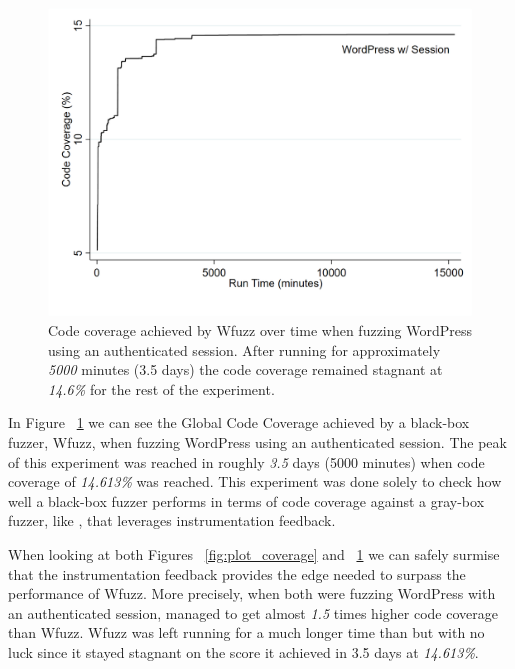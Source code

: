 \begin{figure}[!htb]
  \centering \includegraphics[width=\linewidth]{figures/plot_coverage2.pdf}
  \caption{Code coverage achieved by Wfuzz over time when fuzzing WordPress using an authenticated session. After running for approximately \emph{5000} minutes (3.5 days) the code coverage remained stagnant at \emph{14.6\%} for the rest of the experiment.}
  \label{fig:plot_coverage2}
\end{figure}

In Figure ~\ref{fig:plot_coverage2} we can see the Global Code Coverage achieved by a black-box fuzzer, Wfuzz, when fuzzing WordPress using an authenticated session. The peak of this experiment was reached in roughly \emph{3.5} days (5000 minutes) when code coverage of \emph{14.613\%} was reached. This experiment was done solely to check how well a black-box fuzzer performs in terms of code coverage against a gray-box fuzzer, like \pname{}, that leverages instrumentation feedback. 

When looking at both Figures ~\ref{fig:plot_coverage} and ~\ref{fig:plot_coverage2} we can safely surmise that the instrumentation feedback provides \pname{} the edge needed to surpass the performance of Wfuzz. More precisely, when both were fuzzing WordPress with an authenticated session, \pname{} managed to get almost \emph{1.5} times higher code coverage than Wfuzz. Wfuzz was left running for a much longer time than \pname{} but with no luck since it stayed stagnant on the score it achieved in 3.5 days at \emph{14.613\%}.